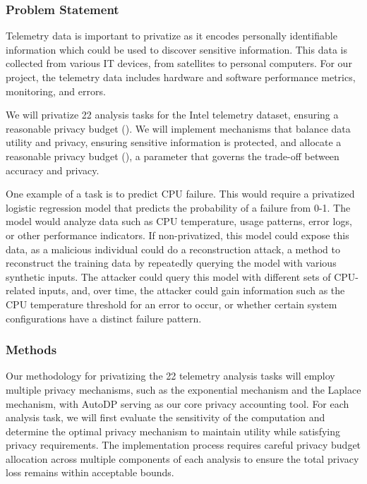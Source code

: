 \documentclass[12pt,letterpaper]{article}
\begin{document}
\subsubsection{Problem Statement}

Telemetry data is important to privatize as it encodes personally identifiable information which could be used to discover sensitive information. This data is collected from various IT devices, from satellites to personal computers. For our project, the telemetry data includes hardware and software performance metrics, monitoring, and errors. 

We will privatize 22 analysis tasks for the Intel telemetry dataset, ensuring a reasonable privacy budget (). We will implement mechanisms that balance data utility and privacy, ensuring sensitive information is protected, and allocate a reasonable privacy budget (), a parameter that governs the trade-off between accuracy and privacy.

One example of a task is to predict CPU failure. This would require a privatized logistic regression model that predicts the probability of a failure from 0-1. The model would analyze data such as CPU temperature, usage patterns, error logs, or other performance indicators. If non-privatized, this model could expose this data, as a malicious individual could do a reconstruction attack, a method to reconstruct the training data by repeatedly querying the model with various synthetic inputs. The attacker could query this model with different sets of CPU-related inputs, and, over time, the attacker could gain information such as the CPU temperature threshold for an error to occur, or whether certain system configurations have a distinct failure pattern.

\subsubsection{Methods}

Our methodology for privatizing the 22 telemetry analysis tasks will employ multiple privacy mechanisms, such as the exponential mechanism and the Laplace mechanism, with AutoDP serving as our core privacy accounting tool. For each analysis task, we will first evaluate the sensitivity of the computation and determine the optimal privacy mechanism to maintain utility while satisfying privacy requirements. The implementation process requires careful privacy budget allocation across multiple components of each analysis to ensure the total privacy loss remains within acceptable bounds.
\end{document}
